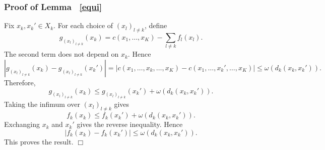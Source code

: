 \documentclass[twoside,11pt,a4paper]{article}
\newcommand*{\SavedRef}{}
\let\SavedRef\ref
\renewcommand*{\ref}[1]{  \begingroup
    \hypersetup{
      linkcolor=linkequation,
      linkbordercolor=linkequation,
    }    \SavedRef{#1}  \endgroup
}
\begin{document}
\subsubsection*{Proof of Lemma~\ref{equi}}
Fix \(x_k,x_k'\in X_k\). For each choice of \((x_l)_{l\ne k}\), define
\[
g_{(x_l)_{l\ne k}}(x_k)
=
c(x_1,\ldots,x_K)-\sum_{l\ne k} f_l(x_l).
\]
The second term does not depend on \(x_k\). Hence
\[
\left|
g_{(x_l)_{l\ne k}}(x_k)
-
g_{(x_l)_{l\ne k}}(x_k')
\right|
=
\left|
c(x_1,\ldots,x_k,\ldots,x_K)
-
c(x_1,\ldots,x_k',\ldots,x_K)
\right|
\le
\omega(d_k(x_k,x_k')).
\]
Therefore,
\[
g_{(x_l)_{l\ne k}}(x_k)
\le
g_{(x_l)_{l\ne k}}(x_k')
+
\omega(d_k(x_k,x_k')).
\]
Taking the infimum over \((x_l)_{l\ne k}\) gives
\[
f_k(x_k)
\le
f_k(x_k')
+
\omega(d_k(x_k,x_k')).
\]
Exchanging \(x_k\) and \(x_k'\) gives the reverse inequality. Hence
\[
|f_k(x_k)-f_k(x_k')|
\le
\omega(d_k(x_k,x_k')).
\]
This proves the result.
\hfill\(\Box\)
\end{document}
